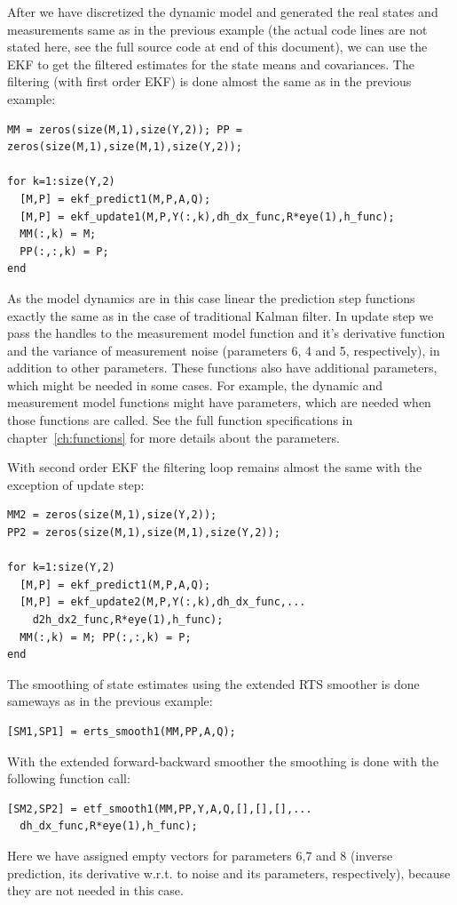 After we have discretized the dynamic model and generated the real
states and measurements same as in the previous example (the actual
code lines are not stated here, see the full source code at end of
this document), we can use the EKF to get the filtered estimates for
the state means and covariances. The filtering (with first order EKF)
is done almost the same as in the previous example:
%
\begin{lstlisting} 
MM = zeros(size(M,1),size(Y,2)); PP =
zeros(size(M,1),size(M,1),size(Y,2));

for k=1:size(Y,2) 
  [M,P] = ekf_predict1(M,P,A,Q); 
  [M,P] = ekf_update1(M,P,Y(:,k),dh_dx_func,R*eye(1),h_func); 
  MM(:,k) = M;
  PP(:,:,k) = P; 
end
\end{lstlisting}
%
As the model dynamics are in this case linear the prediction step
functions exactly the same as in the case of traditional Kalman
filter. In update step we pass the handles to the measurement model
function and it's derivative function and the variance of measurement
noise (parameters 6, 4 and 5, respectively), in addition to other
parameters. These functions also have additional parameters, which
might be needed in some cases. For example, the dynamic and
measurement model functions might have parameters, which are needed
when those functions are called. See the full function specifications
in chapter~\ref{ch:functions} for more details about the parameters.

With second order EKF the filtering loop remains almost the same with
the exception of update step:
%
\begin{lstlisting} 
MM2 = zeros(size(M,1),size(Y,2)); 
PP2 = zeros(size(M,1),size(M,1),size(Y,2));

for k=1:size(Y,2) 
  [M,P] = ekf_predict1(M,P,A,Q); 
  [M,P] = ekf_update2(M,P,Y(:,k),dh_dx_func,...  
    d2h_dx2_func,R*eye(1),h_func);
  MM(:,k) = M; PP(:,:,k) = P; 
end
\end{lstlisting}
%


The smoothing of state estimates using the extended RTS smoother is
done sameways as in the previous example:
%
\begin{lstlisting} 
[SM1,SP1] = erts_smooth1(MM,PP,A,Q);
\end{lstlisting}
%
With the extended forward-backward smoother the smoothing is done with
the following function call:
%
\begin{lstlisting} 
[SM2,SP2] = etf_smooth1(MM,PP,Y,A,Q,[],[],[],...
  dh_dx_func,R*eye(1),h_func);
\end{lstlisting}
%
Here we have assigned empty vectors for parameters 6,7 and 8 (inverse
prediction, its derivative w.r.t. to noise and its parameters,
respectively), because they are not needed in this case.

